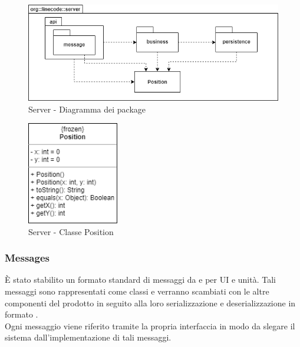 	\begin{figure}[H]
		\centering
		\includegraphics[width=12cm]{img/server_package.png}
		\caption{Server - Diagramma dei package}
	\end{figure}
	
	\begin{figure}[H]
		\centering
		\includegraphics[width=4cm]{img/class_position.png}
		\caption{Server - Classe Position}
	\end{figure}

	\subsubsection{Messages}
		È stato stabilito un formato standard di messaggi da e per UI e unità. Tali messaggi sono rappresentati come classi  e verranno scambiati con le altre componenti del prodotto in seguito alla loro serializzazione e deserializzazione in formato .\\
		Ogni messaggio viene riferito tramite la propria interfaccia in modo da slegare il sistema dall'implementazione di tali messaggi.
	
